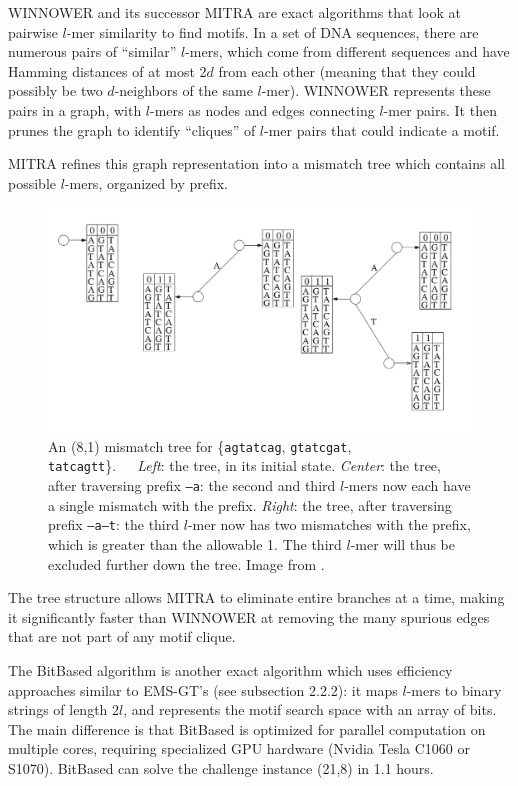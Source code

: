 \documentclass[oneside,12pt]{DISCSthesis}
\begin{document}
		WINNOWER \cite{pevzner2000combinatorial} and its successor MITRA \cite{eskin2002finding} are exact algorithms that look at pairwise $l$-mer similarity to find motifs. In a set of DNA sequences, there are numerous pairs of ``similar'' $l$-mers, which come from different sequences and have Hamming distances of at most 2$d$ from each other (meaning that they could possibly be two $d$-neighbors of the same $l$-mer). WINNOWER represents these pairs in a graph, with $l$-mers as nodes and edges connecting $l$-mer pairs. It then prunes the graph to identify ``cliques'' of $l$-mer pairs that could indicate a motif.

		\noindent MITRA refines this graph representation into a mismatch tree which contains all possible $l$-mers, organized by prefix. 

			\begin{figure}[h] \label{fig:mitra}
				\includegraphics[width=6.0in]{img/mitra}
				\caption{An (8,1) mismatch tree for \{\texttt{agtatcag}, \texttt{gtatcgat}, \texttt{tatcagtt}\}.\ \ \ {\em Left}: the tree, in its initial state. {\em Center}: the tree, after traversing prefix \texttt{--a}: the second and third $l$-mers now each have a single mismatch with the prefix. {\em Right}: the tree, after traversing prefix \texttt{--a--t}: the third $l$-mer now has two mismatches with the prefix, which is greater than the allowable 1. The third $l$-mer will thus be excluded further down the tree. Image from \cite{eskin2002finding}. }
				\end{figure}

		\noindent The tree structure allows MITRA to eliminate entire branches at a time, making it significantly faster than WINNOWER at removing the many spurious edges that are not part of any motif clique.

		The BitBased algorithm \cite{dasari2010efficient} is another exact algorithm which uses efficiency approaches similar to EMS-GT's (see subsection 2.2.2): it maps $l$-mers to binary strings of length $2l$, and represents the motif search space with an array of bits. The main difference is that BitBased is optimized for parallel computation on multiple cores, requiring specialized GPU hardware (Nvidia Tesla C1060 or S1070). BitBased can solve the challenge instance (21,8) in 1.1 hours.
\end{document}
